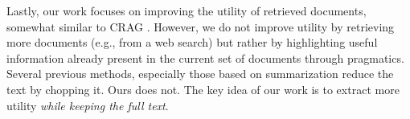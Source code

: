 Lastly, our work focuses on improving the utility of retrieved documents, somewhat similar to CRAG \cite{yan2024corrective}. However, we do not improve utility by retrieving more documents (e.g., from a web search) but rather by highlighting useful information already present in the current set of documents through pragmatics. Several previous methods, especially those based on summarization \cite{xu2024recomp} reduce the text by chopping it. Ours does not. The key idea of our work is to extract more utility \textit{while keeping the full text}.